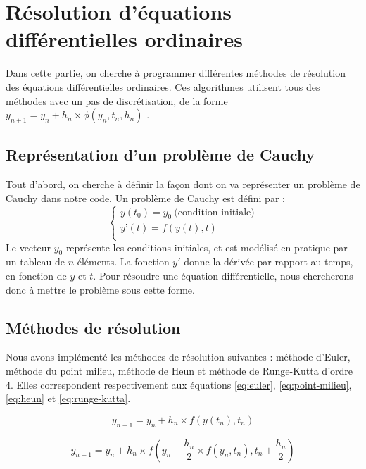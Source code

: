 \section{Résolution d'équations différentielles ordinaires}

Dans cette partie, on cherche à programmer différentes méthodes de résolution
des équations différentielles ordinaires.
Ces algorithmes utilisent tous des méthodes avec un pas de discrétisation, de la forme
$y_{n+1}=y_n+h_n \times \phi (y_n,t_n,h_n)$ .

\subsection{Représentation d'un problème de Cauchy}
Tout d'abord, on cherche à définir la façon dont on va représenter
un problème de Cauchy dans notre code. Un problème de Cauchy est défini par :
\begin{equation}
	\begin{cases}
		y(t_0)=y_0 ~\text{(condition initiale)}\\
		y’(t)=f(y(t),t) \\
	\end{cases}    
\end{equation}
Le vecteur $y_0$ représente les conditions initiales, et est modélisé en pratique par un tableau de $n$ éléments.
La fonction $y'$ donne la dérivée par rapport au temps, en fonction de $y$ et $t$.
Pour résoudre une équation différentielle, nous chercherons donc à mettre le problème sous cette forme.

\subsection{Méthodes de résolution}
Nous avons implémenté les méthodes de résolution suivantes : méthode d’Euler, méthode du point milieu,
méthode de Heun et méthode de Runge-Kutta d’ordre 4. Elles correspondent respectivement aux équations
\ref{eq:euler}, \ref{eq:point-milieu}, \ref{eq:heun} et \ref{eq:runge-kutta}.

\begin{equation}
	y_{n+1} = y_n + h_n \times f(y(t_n), t_n)
	\label{eq:euler}
\end{equation}

\begin{equation}
	y_{n+1} = y_n + h_n \times f \left(y_n + \frac{h_n}{2} \times f(y_n, t_n), t_n + \frac{h_n}{2}\right)
	\label{eq:point-milieu}
\end{equation}

